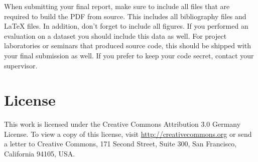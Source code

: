 \documentclass[10pt,a4paper,twoside,journal]{IEEEtran}
\begin{document}
When submitting your final report, make sure to include all files that are
required to build the PDF from source. This includes all bibliography files and
\LaTeX{} files. In addition, don't forget to include all figures. If you
performed an evaluation on a dataset you should include this data as well. For
project laboratories or seminars that produced source code, this should be
shipped with your final submission as well. If you prefer to keep your code
secret, contact your supervisor.

%
%
\section*{License}
This work is licensed under the Creative Commons Attribution 3.0 Germany
License. To view a copy of this license,
visit \href{http://creativecommons.org/licenses/by/3.0/de/}{http://creativecommons.org} or send a letter
to Creative Commons, 171 Second Street, Suite 300, San
Francisco, California 94105, USA.




\end{document}
